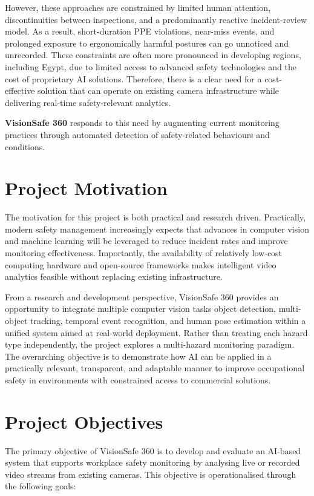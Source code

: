 However, these approaches are constrained by limited human attention, discontinuities between inspections, and a predominantly reactive incident-review model. As a result, short-duration PPE violations, near-miss events, and prolonged exposure to ergonomically harmful postures can go unnoticed and unrecorded. These constraints are often more pronounced in developing regions, including Egypt, due to limited access to advanced safety technologies and the cost of proprietary AI solutions. Therefore, there is a clear need for a cost-effective solution that can operate on existing camera infrastructure while delivering real-time safety-relevant analytics.

\textbf{VisionSafe 360} responds to this need by augmenting current monitoring practices through automated detection of safety-related behaviours and conditions.

\section{Project Motivation}

The motivation for this project is both practical and research driven. Practically, modern safety management increasingly expects that advances in computer vision and machine learning will be leveraged to reduce incident rates and improve monitoring effectiveness. Importantly, the availability of relatively low-cost computing hardware and open-source frameworks makes intelligent video analytics feasible without replacing existing infrastructure.

From a research and development perspective, VisionSafe 360 provides an opportunity to integrate multiple computer vision tasks object detection, multi-object tracking, temporal event recognition, and human pose estimation within a unified system aimed at real-world deployment. Rather than treating each hazard type independently, the project explores a multi-hazard monitoring paradigm. The overarching objective is to demonstrate how AI can be applied in a practically relevant, transparent, and adaptable manner to improve occupational safety in environments with constrained access to commercial solutions.

\section{Project Objectives}

The primary objective of VisionSafe 360 is to develop and evaluate an AI-based system that supports workplace safety monitoring by analysing live or recorded video streams from existing cameras. This objective is operationalised through the following goals:

